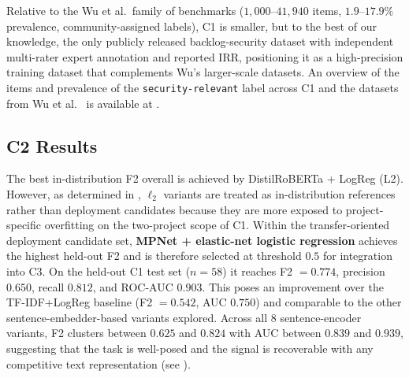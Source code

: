 Relative to the Wu et al.\ family of benchmarks ($1{,}000$--$41{,}940$ items, $1.9$--$17.9\%$ prevalence, community-assigned labels), C1 is smaller, but to the best of our knowledge, the only publicly released backlog-security dataset with independent multi-rater expert annotation and reported IRR, positioning it as a high-precision training dataset that complements Wu's larger-scale datasets.
An overview of the items and prevalence of the \texttt{security-relevant} label across C1 and the datasets from Wu et al.~\cite{wu2022data-quality} is available at .

\subsection*{C2 Results}

The best in-distribution F2 overall is achieved by DistilRoBERTa + LogReg (L2).
However, as determined in , $\ell_2$ variants are treated as in-distribution references rather than deployment candidates because they are more exposed to project-specific overfitting on the two-project scope of C1.
Within the transfer-oriented deployment candidate set, \textbf{MPNet + elastic-net logistic regression} achieves the highest held-out F2 and is therefore selected at threshold $0.5$ for integration into C3.
On the held-out C1 test set ($n=58$) it reaches F2 $=0.774$, precision $0.650$, recall $0.812$, and ROC-AUC $0.903$. This poses an improvement over the TF-IDF+LogReg baseline (F2 $=0.542$, AUC $0.750$) and comparable to the other sentence-embedder-based variants explored.
Across all $8$ sentence-encoder variants, F2 clusters between $0.625$ and $0.824$ with AUC between $0.839$ and $0.939$, suggesting that the task is well-posed and the signal is recoverable with any competitive text representation (see ).

